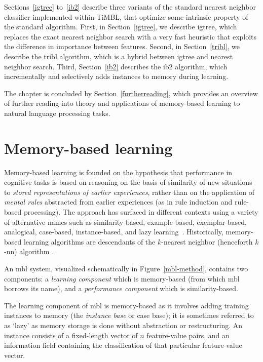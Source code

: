 \documentclass{report}
\begin{document}
Sections~\ref{igtree} to~\ref{ib2} describe three variants of the
standard nearest neighbor classifier implemented within TiMBL, that
optimize some intrinsic property of the standard algorithm. First, in
Section~\ref{igtree}, we describe {\sc igtree}, which replaces the
exact nearest neighbor search with a very fast heuristic that exploits
the difference in importance between features. Second, in
Section~\ref{tribl}, we describe the {\sc tribl} algorithm, which is a
hybrid between {\sc igtree} and nearest neighbor search. Third,
Section~\ref{ib2} describes the {\sc ib2} algorithm, which
incrementally and selectively adds instances to memory during
learning.

The chapter is concluded by Section~\ref{furtherreading}, which
provides an overview of further reading into theory and applications
of memory-based learning to natural language processing tasks.

\section{Memory-based learning}
\label{mbl}

Memory-based learning is founded on the hypothesis that performance in
cognitive tasks is based on reasoning on the basis of similarity of
new situations to {\em stored representations of earlier experiences},
rather than on the application of {\em mental rules}\/ abstracted from
earlier experiences (as in rule induction and rule-based processing).
The approach has surfaced in different contexts using a variety of
alternative names such as similarity-based, example-based,
exemplar-based, analogical, case-based, in\-stance-based, and lazy
learning~\cite{Stanfill+86,Aha+91,Cost+93,Kolodner93,Aha97a}.
Historically, memory-based learning algorithms are descendants of the
$k$-nearest neighbor (henceforth $k$-{\sc nn}) algorithm
\cite{Cover+67,Devijver+82,Aha+91}.

An {\sc mbl} system, visualized schematically in
Figure~\ref{mbl-method}, contains two components: a {\em learning
component}\/ which is memory-based (from which {\sc mbl} borrows its
name), and a {\em performance component}\/ which is similarity-based.

The learning component of {\sc mbl} is memory-based as it involves
adding training instances to memory (the {\em instance base} or case
base); it is sometimes referred to as `lazy' as memory storage is done
without abstraction or restructuring.  An instance consists of a
fixed-length vector of $n$ feature-value pairs, and an information
field containing the classification of that particular feature-value
vector.  
\end{document}
